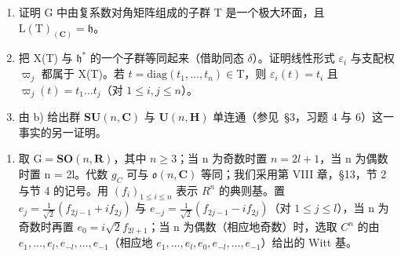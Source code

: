 \begin{enumerate}
\def\labelenumi{\alph{enumi})}
\item
  证明 G 中由复系数对角矩阵组成的子群 T 是一个极大环面，且 \(\mathrm{L}(\mathrm{T})_{(\mathbf{C})} = \mathfrak{h}\)。
\item
  把 X(T) 与 \(\mathfrak{h}^*\) 的一个子群等同起来（借助同态 \(\delta\)）。证明线性形式 \(\varepsilon_i\) 与支配权 \(\varpi_j\) 都属于 X(T)。若 \(t = \mathrm{diag}(t_1, \ldots, t_n) \in \mathrm{T}\)，则 \(\varepsilon_i(t) = t_i\) 且 \(\varpi_j(t) = t_1 \ldots t_j\)（对 \(1 \leq i, j \leq n\)）。
\item
  由 b) 给出群 \(\mathbf{SU}(n,\mathbf{C})\) 与 \(\mathbf{U}(n,\mathbf{H})\) 单连通（参见~§3，习题 4 与 6）这一事实的另一证明。
\end{enumerate}

\begin{enumerate}
\def\labelenumi{\arabic{enumi})}
\setcounter{enumi}{1}
\tightlist
\item
  取 \(\mathrm{G} = \mathbf{SO}(n, \mathbf{R})\)，其中 \(n \geq 3\)；当 n 为奇数时置 \(n = 2l + 1\)，当 n 为偶数时置 n = 2l。代数 \(g_{C}\) 可与 \(\mathfrak{o}(n, \mathbf{C})\) 等同；我们采用第 VIII 章，§13，节 2 与节 4 的记号。用 \((f_i)_{1 \leq i \leq n}\) 表示 \(R^n\) 的典则基。置 \(e_j = \frac{1}{\sqrt{2}}(f_{2j-1} + if_{2j})\) 与 \(e_{-j} = \frac{1}{\sqrt{2}}(f_{2j-1} - if_{2j})\)（对 \(1 \leq j \leq l\)），当 n 为奇数时再置 \(e_0 = i\sqrt{2}f_{2l+1}\)；当 n 为偶数（相应地奇数）时，选取 \(C^n\) 的由 \(e_1, \ldots, e_l, e_{-l}, \ldots, e_{-1}\)（相应地 \(e_1, \ldots, e_l, e_0, e_{-l}, \ldots, e_{-1}\)）给出的 Witt 基。
\end{enumerate}

